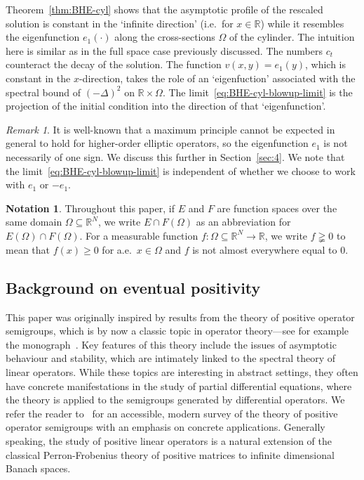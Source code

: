 \documentclass[a4paper, reqno]{amsart}
\numberwithin{equation}{section}
\theoremstyle{plain}
\theoremstyle{definition}
\newtheorem*{notation}{Notation}
\theoremstyle{remark}
\newtheorem{remark}[theorem]{Remark}
\newcommand{\RR}{\mathbb{R}}
\begin{document}
Theorem~\ref{thm:BHE-cyl} shows that the asymptotic profile of the rescaled solution is constant in the `infinite direction' (i.e.\ for $x \in \RR$) while it resembles the eigenfunction $e_1(\cdot)$ along the cross-sections $\Omega$ of the cylinder. The intuition here is similar as in the full space case previously discussed. The numbers $c_t$ counteract the decay of the solution. The function $v(x,y)=e_1(y)$, which is constant in the $x$-direction, takes the role of an `eigenfuction' associated with the spectral bound of $(-\Delta)^2$ on $\RR\times\Omega$. The limit~\eqref{eq:BHE-cyl-blowup-limit} is the projection of the initial condition into the direction of that `eigenfunction'.

\begin{remark}
  It is well-known that a maximum principle cannot be expected in general to hold for higher-order elliptic operators, so the eigenfunction $e_1$ is not necessarily of one sign. We discuss this further in Section~\ref{sec:4}. We note that the limit~\eqref{eq:BHE-cyl-blowup-limit} is independent of whether we choose to work with $e_1$ or $-e_1$.
\end{remark}

\begin{notation}
  Throughout this paper, if $E$ and $F$ are function spaces over the same domain $\Omega \subseteq \RR^N$, we write $E \cap F(\Omega)$ as an abbreviation for $E(\Omega) \cap F(\Omega)$.  For a measurable function $f\colon \Omega \subseteq \RR^N \to \RR$, we write $f \gneqq 0$ to mean that $f(x) \geq 0$ for a.e.\ $x \in \Omega$ and $f$ is not almost everywhere equal to 0.
\end{notation}

\subsection{Background on eventual positivity}
This paper was originally inspired by results from the theory of positive operator semigroups, which is by now a classic topic in operator theory---see for example the monograph~\cite{AGG}. Key features of this theory include the issues of asymptotic behaviour and stability, which are intimately linked to the spectral theory of linear operators. While these topics are interesting in abstract settings, they often have concrete manifestations in the study of partial differential equations, where the theory is applied to the semigroups generated by differential operators. We refer the reader to~\cite{BFR} for an accessible, modern survey of the theory of positive operator semigroups with an emphasis on concrete applications. Generally speaking, the study of positive linear operators is a natural extension of the classical Perron-Frobenius theory of positive matrices to infinite dimensional Banach spaces.
\end{document}
